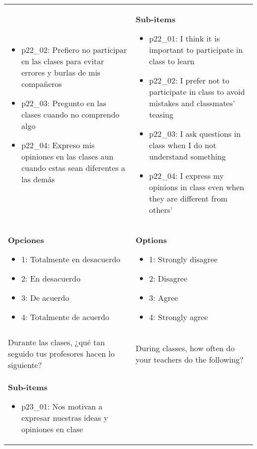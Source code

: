 \documentclass[11pt]{article}
\begin{document}
\begin{longtable}{@{}LL@{}}
\begin{itemize}[leftmargin=*]
\item p22\_02: Prefiero no participar en las clases para evitar errores y burlas de mis compañeros
\item p22\_03: Pregunto en las clases cuando no comprendo algo
\item p22\_04: Expreso mis opiniones en las clases aun cuando estas sean diferentes a las demás\end{itemize} & \textbf{Sub-items}\par\begin{itemize}[leftmargin=*]\item p22\_01: I think it is important to participate in class to learn
\item p22\_02: I prefer not to participate in class to avoid mistakes and classmates' teasing
\item p22\_03: I ask questions in class when I do not understand something
\item p22\_04: I express my opinions in class even when they are different from others'\end{itemize} \\
\textbf{Opciones}\par\begin{itemize}[leftmargin=*]\item 1: Totalmente en desacuerdo
\item 2: En desacuerdo
\item 3: De acuerdo
\item 4: Totalmente de acuerdo\end{itemize} & \textbf{Options}\par\begin{itemize}[leftmargin=*]\item 1: Strongly disagree
\item 2: Disagree
\item 3: Agree
\item 4: Strongly agree\end{itemize} \\
\addlinespace[4pt]
 \\ 
Durante las clases, ¿qué tan seguido tus profesores hacen lo siguiente? & During classes, how often do your teachers do the following? \\
\textbf{Sub-items}\par\begin{itemize}[leftmargin=*]\item p23\_01: Nos motivan a expresar nuestras ideas y opiniones en clase

\end{itemize}
\end{longtable}
\end{document}
